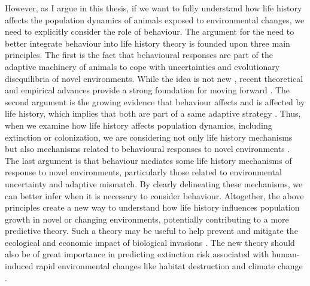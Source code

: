 However, as I argue in this thesis, if we want to fully understand how life 
history affects the population dynamics of animals exposed to environmental 
changes, we need to explicitly consider the role of behaviour. The argument for 
the need to better integrate behaviour into life history theory is founded upon 
three main principles. The first is the fact that behavioural responses are part 
of the adaptive machinery of animals to cope with uncertainties and evolutionary 
disequilibria of novel environments. While the idea is not new \citep{mayr1965}, 
recent theoretical and empirical advances provide a strong foundation for 
moving forward \citep{Sol2020, Ducatez2020}. The second argument is the growing 
evidence that behaviour affects and is affected by life history, which implies 
that both are part of a same adaptive strategy \citep{Sol2016, Sol2016a}. Thus, 
when we examine how life history affects population dynamics, including 
extinction or colonization, we are considering not only life history mechanisms 
but also mechanisms related to behavioural responses to novel environments 
\citep{Sol2016}. The last argument is that behaviour mediates some life history
mechanisms of response to novel environments, particularly those related to
environmental uncertainty and adaptive mismatch. By clearly delineating these
mechanisms, we can better infer when it is necessary to consider behaviour.
Altogether, the above principles create a new way to understand how life history
influences population growth in novel or changing environments, potentially 
contributing to a more predictive theory. Such a theory may be useful to help 
prevent and mitigate the ecological and economic impact of biological invasions 
\citep{Kolar2002, Vall-llosera2009, Leung2012}. The new theory should also be of 
great importance in predicting extinction risk associated with human-induced 
rapid environmental changes like habitat destruction and climate change 
\citep{Saether2000, Sih2011}.

\clearpage

